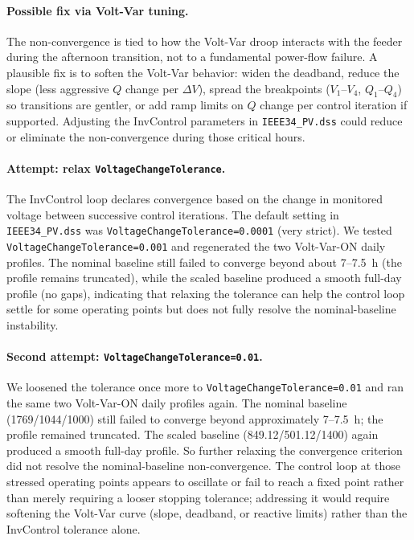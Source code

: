 \documentclass[11pt]{article}
\begin{document}
\paragraph{Possible fix via Volt-Var tuning.}
The non-convergence is tied to how the Volt-Var droop interacts with the feeder during the afternoon transition, not to a fundamental power-flow failure. A plausible fix is to soften the Volt-Var behavior: widen the deadband, reduce the slope (less aggressive $Q$ change per $\Delta V$), spread the breakpoints ($V_1$--$V_4$, $Q_1$--$Q_4$) so transitions are gentler, or add ramp limits on $Q$ change per control iteration if supported. Adjusting the InvControl parameters in \texttt{IEEE34\_PV.dss} could reduce or eliminate the non-convergence during those critical hours.

\paragraph{Attempt: relax \texttt{VoltageChangeTolerance}.}
The InvControl loop declares convergence based on the change in monitored voltage between successive control iterations. The default setting in \texttt{IEEE34\_PV.dss} was \texttt{VoltageChangeTolerance=0.0001} (very strict). We tested \texttt{VoltageChangeTolerance=0.001} and regenerated the two Volt-Var-ON daily profiles. The nominal baseline still failed to converge beyond about 7--7.5~h (the profile remains truncated), while the scaled baseline produced a smooth full-day profile (no gaps), indicating that relaxing the tolerance can help the control loop settle for some operating points but does not fully resolve the nominal-baseline instability.

\paragraph{Second attempt: \texttt{VoltageChangeTolerance=0.01}.}
We loosened the tolerance once more to \texttt{VoltageChangeTolerance=0.01} and ran the same two Volt-Var-ON daily profiles again. The nominal baseline (1769/1044/1000) still failed to converge beyond approximately 7--7.5~h; the profile remained truncated. The scaled baseline (849.12/501.12/1400) again produced a smooth full-day profile. So further relaxing the convergence criterion did not resolve the nominal-baseline non-convergence. The control loop at those stressed operating points appears to oscillate or fail to reach a fixed point rather than merely requiring a looser stopping tolerance; addressing it would require softening the Volt-Var curve (slope, deadband, or reactive limits) rather than the InvControl tolerance alone.
\end{document}
